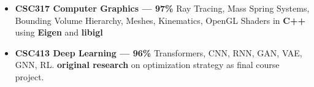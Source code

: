 \documentclass[10pt,a4paper,ragged2e,withhyper]{altacv}
\begin{document}
\begin{paracol}{2}
\begin{itemize}
    
 
    
    
\end{itemize}


\vspace{-5pt}
\begin{itemize}
    
    \item  \textbf{CSC317 Computer Graphics --- 97\%}
    Ray Tracing, Mass Spring Systems, Bounding Volume Hierarchy, Meshes, Kinematics, OpenGL Shaders in \textbf{C++} using
        \textbf{Eigen} and \textbf{libigl} 

    \item  \textbf{CSC413 Deep Learning --- 96\%} Transformers, CNN,
        RNN, GAN, VAE, GNN, RL. \textbf{original research} on optimization
        strategy as final course project.\ 
    

\end{itemize}


\end{paracol}
\end{document}
